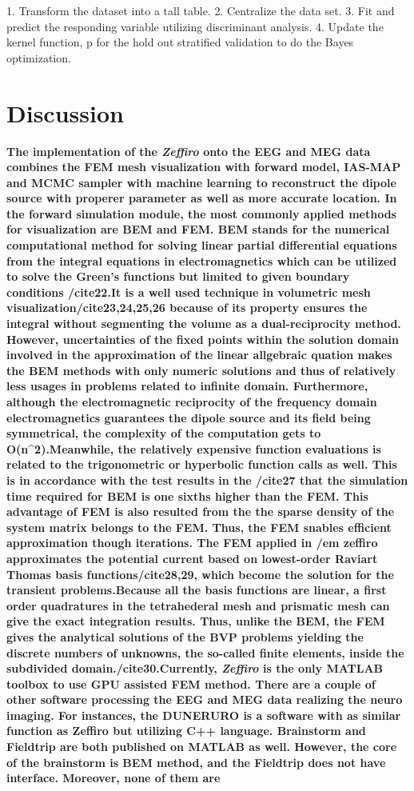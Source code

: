 \documentclass[5p]{elsarticle}
\begin{document}
\begin{frontmatter}

1. Transform the dataset into a tall table.
2. Centralize the data set.
3. Fit and predict the responding variable utilizing discriminant analysis.
4. Update the kernel function, p for the hold out stratified validation to do the Bayes optimization.

\section{Discussion}
\bf The implementation of the {\em Zeffiro} onto the EEG and MEG data combines the FEM mesh visualization with forward model, IAS-MAP and MCMC sampler with machine learning to reconstruct the dipole source with properer parameter as well as more accurate location.
In the forward simulation module, the most commonly applied methods for visualization are BEM and FEM. BEM stands for the numerical computational method for solving linear partial differential equations from the integral equations in electromagnetics which can be utilized to solve the Green's functions but limited to given boundary conditions /cite{22}.It is a well used technique in volumetric mesh visualization/cite{23,24,25,26} because of its property ensures the integral without segmenting the volume as a dual-reciprocity method. However, uncertainties of the fixed points within the solution domain involved in the approximation of the linear allgebraic quation makes the BEM methods with only numeric solutions and thus of relatively less usages in problems related to infinite domain. Furthermore, although the electromagnetic reciprocity of the frequency domain electromagnetics guarantees the dipole source and its field being symmetrical, the complexity of the computation gets to O(n^2).Meanwhile, the relatively expensive function evaluations is related to the trigonometric or hyperbolic function calls as well. This is in accordance with the test results in the /cite{27} that the simulation time required for BEM is one sixths higher than the FEM. This advantage of FEM is also resulted from the the sparse density of the system matrix belongs to the FEM. Thus, the FEM snables efficient approximation though iterations. The FEM applied in {/em zeffiro} approximates the potential current based on lowest-order Raviart Thomas basis functions/cite{28,29}, which become the solution for the transient problems.Because all the basis functions are linear, a first order quadratures in the tetrahederal mesh and prismatic mesh can give the exact integration results. Thus, unlike the BEM, the FEM gives the analytical solutions of the BVP problems yielding the discrete numbers of unknowns, the so-called finite elements, inside the subdivided domain./cite{30}.Currently, {\em Zeffiro} is the only MATLAB toolbox to use GPU assisted FEM method. There are a couple of other software processing the EEG and MEG data realizing the neuro imaging. For instances, the DUNERURO is a software with as similar function as Zeffiro but utilizing C++ language. Brainstorm and Fieldtrip are both published on MATLAB as well. However, the core of the brainstorm is BEM method, and the Fieldtrip does not have interface. Moreover, none of them are 
\end{frontmatter}
\end{document}
